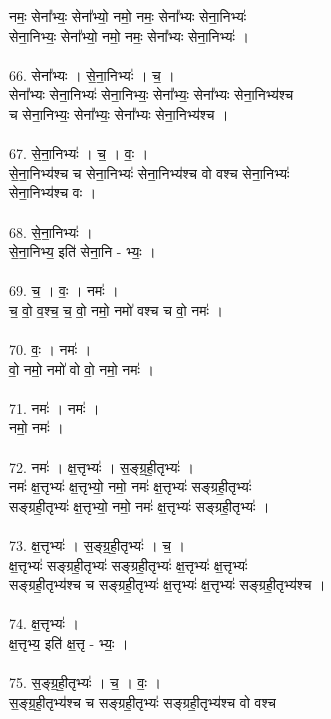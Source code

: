 नमः॒ सेना᳚भ्यः॒ सेना᳚भ्यो॒ नमो॒ नमः॒ सेना᳚भ्यः सेना॒निभ्यः॑\\
सेना॒निभ्यः॒ सेना᳚भ्यो॒ नमो॒ नमः॒ सेना᳚भ्यः सेना॒निभ्यः॑ ।\\
\\
66. सेना᳚भ्यः । से॒ना॒निभ्यः॑ । च॒ ।\\
सेना᳚भ्यः सेना॒निभ्यः॑ सेना॒निभ्यः॒ सेना᳚भ्यः॒ सेना᳚भ्यः सेना॒निभ्य॑श्च\\
च सेना॒निभ्यः॒ सेना᳚भ्यः॒ सेना᳚भ्यः सेना॒निभ्य॑श्च ।\\
\\
67. से॒ना॒निभ्यः॑ । च॒ । वः॒ ।\\
से॒ना॒निभ्य॑श्च च सेना॒निभ्यः॑ सेना॒निभ्य॑श्च वो वश्च सेना॒निभ्यः॑\\
सेना॒निभ्य॑श्च वः ।\\
\\
68. से॒ना॒निभ्यः॑ ।\\
से॒ना॒निभ्य॒ इति॑ सेना॒नि - भ्यः॒ ।\\
\\
69. च॒ । वः॒ । नमः॑ ।\\
च॒ वो॒ व॒श्च॒ च॒ वो॒ नमो॒ नमो॑ वश्च च वो॒ नमः॑ ।\\
\\
70. वः॒ । नमः॑ ।\\
वो॒ नमो॒ नमो॑ वो वो॒ नमो॒ नमः॑ ।\\
\\
71. नमः॑ । नमः॑ ।\\
नमो॒ नमः॑ ।\\
\\
72. नमः॑ । क्ष॒त्तृभ्यः॑ । स॒ङ्ग्र॒ही॒तृभ्यः॑ ।\\
नमः॑ क्ष॒त्तृभ्यः॑ क्ष॒त्तृभ्यो॒ नमो॒ नमः॑ क्ष॒त्तृभ्यः॑ सङ्ग्रही॒तृभ्यः॑\\
सङ्ग्रही॒तृभ्यः॑ क्ष॒त्तृभ्यो॒ नमो॒ नमः॑ क्ष॒त्तृभ्यः॑ सङ्ग्रही॒तृभ्यः॑ ।\\
\\
73. क्ष॒त्तृभ्यः॑ । स॒ङ्ग्र॒ही॒तृभ्यः॑ । च॒ ।\\
क्ष॒त्तृभ्यः॑ सङ्ग्रही॒तृभ्यः॑ सङ्ग्रही॒तृभ्यः॑ क्ष॒त्तृभ्यः॑ क्ष॒त्तृभ्यः॑\\
सङ्ग्रही॒तृभ्य॑श्च च सङ्ग्रही॒तृभ्यः॑ क्ष॒त्तृभ्यः॑ क्ष॒त्तृभ्यः॑ सङ्ग्रही॒तृभ्य॑श्च ।\\
\\
74. क्ष॒त्तृभ्यः॑ ।\\
क्ष॒त्तृभ्य॒ इति॑ क्ष॒त्तृ - भ्यः॒ ।\\
\\
75. स॒ङ्ग्र॒ही॒तृभ्यः॑ । च॒ । वः॒ ।\\
स॒ङ्ग्र॒ही॒तृभ्य॑श्च च सङ्ग्रही॒तृभ्यः॑ सङ्ग्रही॒तृभ्य॑श्च वो वश्च\\
